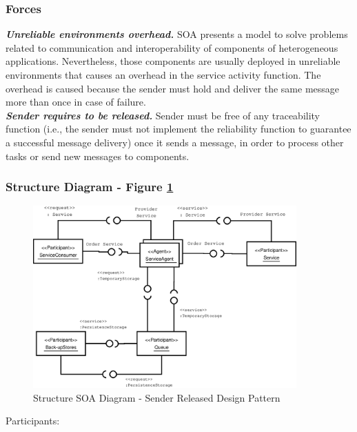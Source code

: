 \subsubsection{Forces}

\noindent\textbf{\textit{Unreliable environments overhead. }} SOA presents a model to solve problems related to communication and interoperability of components of heterogeneous applications. Nevertheless, those components are usually deployed in unreliable environments that causes an overhead in the service activity function. The overhead is caused because the sender must hold and deliver the same message more than once in case of failure. \\

\noindent\textbf{\textit{Sender requires to be released.  }}Sender must be free of any traceability function (i.e., the sender must not implement the reliability function to guarantee a successful message delivery) once it sends a message, in order to process other tasks or send new messages to components.


\subsubsection{Structure Diagram - Figure \ref{fig:str_diagram_sender}}

\begin{figure}
	\centering
	\includegraphics*[width=0.9\textwidth, keepaspectratio=false]{fig/image14.eps}
	\caption{Structure SOA Diagram - Sender Released Design Pattern}
	\label{fig:str_diagram_sender}
\end{figure}

\begin{description}
	\item[Participants:]
\end{description}

